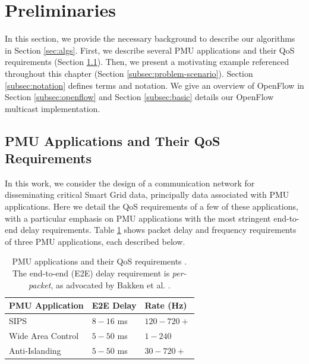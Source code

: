 
\section{Preliminaries}
\label{sec:prelim}


In this section, we provide the necessary background to describe our algorithms in Section \ref{sec:algs}. First, we describe several PMU applications and their QoS requirements 
(Section \ref{subsec:pmu-requirements}).  Then, we present a motivating example referenced throughout this chapter (Section \ref{subsec:problem-scenario}).
Section \ref{subsec:notation} defines terms and notation.  We give an overview of OpenFlow in Section \ref{subsec:openflow} and Section \ref{subsec:basic} details
our OpenFlow multicast implementation.


\subsection{PMU Applications and Their QoS Requirements} 
\label{subsec:pmu-requirements}

In this work, we consider the design of a communication network for disseminating critical Smart Grid data, principally data associated with PMU applications.  Here
we detail the QoS requirements of a few of these applications, with a particular emphasis on PMU applications with the most stringent end-to-end delay requirements.
Table \ref{tab:app-requirements} shows packet delay and frequency requirements of three PMU applications, each described below.

\begin{table}[ht]
\begin{center}
\begin{tabular}{|l|l|l||} 
\hline
   	{\bf PMU Application} & {\bf E2E Delay} & {\bf Rate (Hz)} \\ 
		  \hline \hline
		
			SIPS & $8-16$ ms & $120-720+$ \\ 
			Wide Area Control  & $5-50$ ms & $1-240$ \\
			Anti-Islanding  & $5-50$ ms & $30-720+$  \\
			\hline
			\end{tabular}
			\end{center}
\caption{PMU applications and their QoS requirements \cite{Bakken11}.  The end-to-end (E2E) delay requirement is \emph{per-packet}, as advocated by Bakken et al. \cite{Bakken11}.} 
\label{tab:app-requirements}
\end{table}

